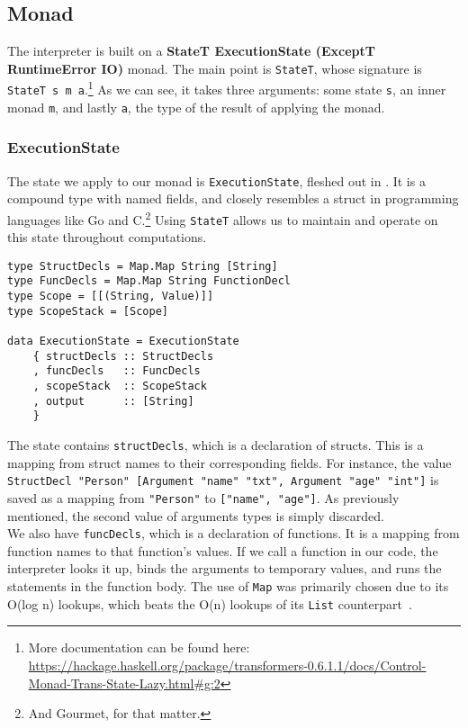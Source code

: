 \subsection{Monad}

The interpreter is built on a \textbf{StateT ExecutionState (ExceptT RuntimeError IO)} monad. The main point is \texttt{StateT}, whose signature is \texttt{StateT s m a}.\footnote{More documentation can be found here: \url{https://hackage.haskell.org/package/transformers-0.6.1.1/docs/Control-Monad-Trans-State-Lazy.html\#g:2}} As we can see, it takes three arguments: some state \texttt{s}, an inner monad \texttt{m}, and lastly \texttt{a}, the type of the result of applying the monad.

\subsubsection{ExecutionState}

The state we apply to our monad is \texttt{ExecutionState}, fleshed out in . It is a compound type with named fields, and closely resembles a struct in programming languages like Go and C.\footnote{And Gourmet, for that matter.} Using \texttt{StateT} allows us to maintain and operate on this state throughout computations. \\

\begin{lstlisting}[caption={The Psnodig interpreter's state.}, captionpos=b, label={psnodigInterpreterState}]
type StructDecls = Map.Map String [String]
type FuncDecls = Map.Map String FunctionDecl
type Scope = [[(String, Value)]]
type ScopeStack = [Scope]

data ExecutionState = ExecutionState
    { structDecls :: StructDecls
    , funcDecls   :: FuncDecls
    , scopeStack  :: ScopeStack
    , output      :: [String]
    }
\end{lstlisting}

The state contains \texttt{structDecls}, which is a declaration of structs. This is a mapping from struct names to their corresponding fields. For instance, the value \texttt{StructDecl "Person" [Argument "name" "txt", Argument "age" "int"]} is saved as a mapping from \texttt{"Person"} to \texttt{["name", "age"]}. As previously mentioned, the second value of arguments types is simply discarded. \\

We also have \texttt{funcDecls}, which is a declaration of functions. It is a mapping from function names to that function's values. If we call a function in our code, the interpreter looks it up, binds the arguments to temporary values, and runs the statements in the function body. The use of \texttt{Map} was primarily chosen due to its O(log n) lookups, which beats the O(n) lookups of its \texttt{List} counterpart~\cite{haskellMap, haskellList}. \\

